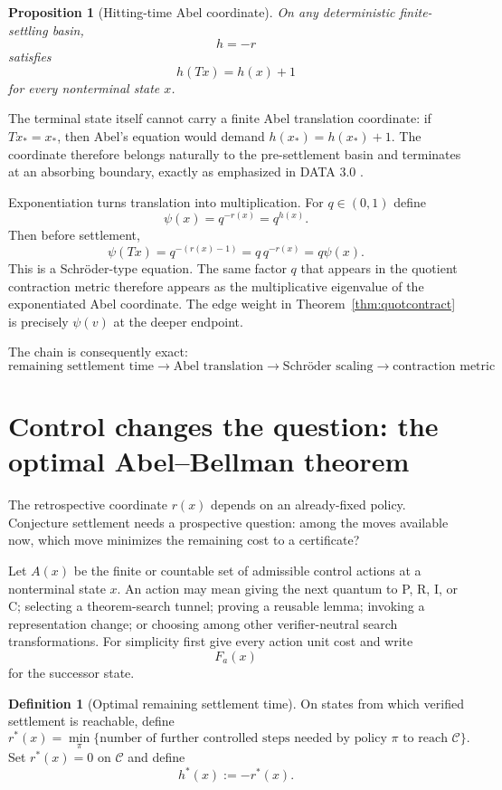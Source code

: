 \documentclass[11pt]{article}
\newtheorem{proposition}[theorem]{Proposition}
\theoremstyle{definition}
\newtheorem{definition}[theorem]{Definition}
\theoremstyle{remark}
\newcommand{\Cset}{\mathcal C}
\begin{document}
\begin{proposition}[Hitting-time Abel coordinate]\label{prop:abel}
On any deterministic finite-settling basin,
\[
h=-r
\]
satisfies
\[
h(Tx)=h(x)+1
\]
for every nonterminal state $x$.
\end{proposition}

The terminal state itself cannot carry a finite Abel translation coordinate: if $Tx_*=x_*$, then Abel's equation would demand $h(x_*)=h(x_*)+1$. The coordinate therefore belongs naturally to the pre-settlement basin and terminates at an absorbing boundary, exactly as emphasized in DATA 3.0 \cite{Data3}.

Exponentiation turns translation into multiplication. For $q\in(0,1)$ define
\[
\psi(x)=q^{-r(x)}=q^{h(x)}.
\]
Then before settlement,
\[
\psi(Tx)=q^{-(r(x)-1)}=q\,q^{-r(x)}=q\psi(x).
\]
This is a Schr\"oder-type equation. The same factor $q$ that appears in the quotient contraction metric therefore appears as the multiplicative eigenvalue of the exponentiated Abel coordinate. The edge weight in Theorem~\ref{thm:quotcontract} is precisely $\psi(v)$ at the deeper endpoint.

The chain is consequently exact:
\[
\boxed{
\text{remaining settlement time}
\to
\text{Abel translation}
\to
\text{Schr\"oder scaling}
\to
\text{contraction metric}
}.
\]

\section{Control changes the question: the optimal Abel--Bellman theorem}

The retrospective coordinate $r(x)$ depends on an already-fixed policy. Conjecture settlement needs a prospective question: among the moves available now, which move minimizes the remaining cost to a certificate?

Let $A(x)$ be the finite or countable set of admissible control actions at a nonterminal state $x$. An action may mean giving the next quantum to P, R, I, or C; selecting a theorem-search tunnel; proving a reusable lemma; invoking a representation change; or choosing among other verifier-neutral search transformations. For simplicity first give every action unit cost and write
\[
F_a(x)
\]
for the successor state.

\begin{definition}[Optimal remaining settlement time]
On states from which verified settlement is reachable, define
\[
r^*(x)
=
\min_{\pi}
\{\text{number of further controlled steps needed by policy }\pi\text{ to reach }\Cset\}.
\]
Set $r^*(x)=0$ on $\Cset$ and define
\[
h^*(x):=-r^*(x).
\]
\end{definition}
\end{document}
